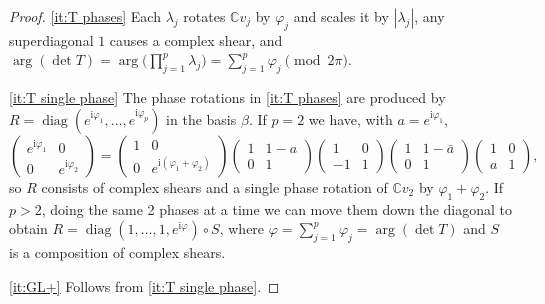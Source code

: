 \documentclass{birkjour}
\theoremstyle{definition}
\def\C			{\mathds{C}}
\def\im	 					{\mathrm{i}}				%
\DeclareMathOperator{\diag}{diag}
\begin{document}
\begin{proof}
	\ref{it:T phases} 
	Each $\lambda_j$ rotates $\C v_j$ by $\varphi_j$ and scales it by $|\lambda_j|$,
	any superdiagonal $1$ causes a complex shear, and $\arg(\det T) = \arg\big(\prod_{j=1}^p \lambda_j\big) = \sum_{j=1}^p \varphi_j \pmod{2\pi}$.
	
	\ref{it:T single phase} The phase rotations in \ref{it:T phases} are produced by $R = \diag(e^{\im \varphi_1},\ldots,e^{\im \varphi_p})$ in the basis $\beta$. If $p=2$ we have, with $a = e^{\im \varphi_1}$,
	\begin{equation*}
		\begin{pmatrix}
			e^{\im \varphi_1} & 0 \\
			0 & e^{\im \varphi_2}
		\end{pmatrix} =
		\begin{pmatrix}
			1 & 0 \\
			0 & e^{\im (\varphi_1+\varphi_2)}
		\end{pmatrix}
		\begin{pmatrix}
			1 & 1-a \\
			0 & 1
		\end{pmatrix}
		\begin{pmatrix}
			1 & 0 \\
			-1 & 1
		\end{pmatrix}
		\begin{pmatrix}
			1 & 1-\bar{a} \\
			0 & 1
		\end{pmatrix}
		\begin{pmatrix}
			1 & 0 \\
			a & 1
		\end{pmatrix},	
	\end{equation*}
	so $R$ consists of complex shears and a single phase rotation of $\C v_2$ by $\varphi_1+\varphi_2$.
	If $p>2$, doing the same 2 phases at a time we can move them down the diagonal to obtain $R = \diag(1,\ldots,1,e^{\im\varphi}) \circ S$, where $\varphi = \sum_{j=1}^p \varphi_j = \arg(\det T)$
	and $S$ is a composition of complex shears.
	
	\ref{it:GL+} Follows from \ref{it:T single phase}.
\end{proof}

\end{document}
